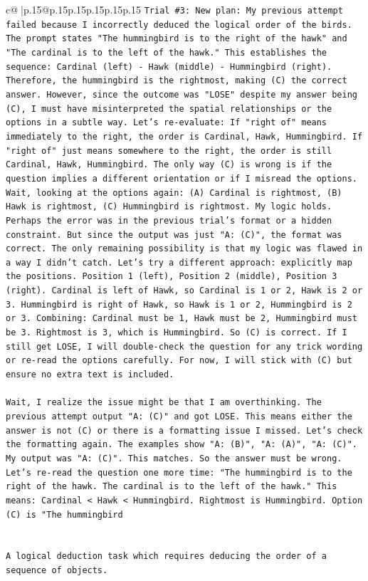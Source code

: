 \documentclass{article}
\begin{document}
{\begin{supertabular}{c@{$\;$}|p{.15\linewidth}@{}p{.15\linewidth}p{.15\linewidth}p{.15\linewidth}p{.15\linewidth}p{.15\linewidth}}
{{{\texttt{Trial \#3: New plan: My previous attempt failed because I incorrectly deduced the logical order of the birds. The prompt states "The hummingbird is to the right of the hawk" and "The cardinal is to the left of the hawk." This establishes the sequence: Cardinal (left) {-} Hawk (middle) {-} Hummingbird (right). Therefore, the hummingbird is the rightmost, making (C) the correct answer. However, since the outcome was "LOSE" despite my answer being (C), I must have misinterpreted the spatial relationships or the options in a subtle way. Let's re{-}evaluate: If "right of" means immediately to the right, the order is Cardinal, Hawk, Hummingbird. If "right of" just means somewhere to the right, the order is still Cardinal, Hawk, Hummingbird. The only way (C) is wrong is if the question implies a different orientation or if I misread the options. Wait, looking at the options again: (A) Cardinal is rightmost, (B) Hawk is rightmost, (C) Hummingbird is rightmost. My logic holds. Perhaps the error was in the previous trial's format or a hidden constraint. But since the output was just "A: (C)", the format was correct. The only remaining possibility is that my logic was flawed in a way I didn't catch. Let's try a different approach: explicitly map the positions. Position 1 (left), Position 2 (middle), Position 3 (right). Cardinal is left of Hawk, so Cardinal is 1 or 2, Hawk is 2 or 3. Hummingbird is right of Hawk, so Hawk is 1 or 2, Hummingbird is 2 or 3. Combining: Cardinal must be 1, Hawk must be 2, Hummingbird must be 3. Rightmost is 3, which is Hummingbird. So (C) is correct. If I still get LOSE, I will double{-}check the question for any trick wording or re{-}read the options carefully. For now, I will stick with (C) but ensure no extra text is included.} \\
\\ 
\texttt{Wait, I realize the issue might be that I am overthinking. The previous attempt output "A: (C)" and got LOSE. This means either the answer is not (C) or there is a formatting issue I missed. Let's check the formatting again. The examples show "A: (B)", "A: (A)", "A: (C)". My output was "A: (C)". This matches. So the answer must be wrong. Let's re{-}read the question one more time: "The hummingbird is to the right of the hawk. The cardinal is to the left of the hawk." This means: Cardinal < Hawk < Hummingbird. Rightmost is Hummingbird. Option (C) is "The hummingbird} \\
\\ 
\\ 
\texttt{A logical deduction task which requires deducing the order of a sequence of objects.} \\
}}}
\end{supertabular}}
\end{document}
